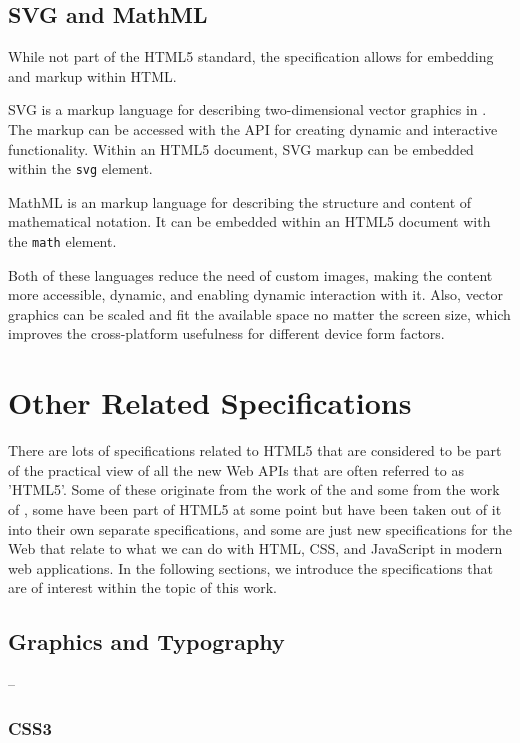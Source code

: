 \subsection{SVG and MathML}

While not part of the HTML5 standard, the specification allows for
embedding  \cite{SVGTiny12} and  \cite{MathML}
markup within HTML.

SVG is a markup language for describing two-dimensional vector
graphics in . The markup can be accessed with the 
API for creating dynamic and interactive functionality. Within an
HTML5 document, SVG markup can be embedded within the \texttt{svg}
element.

MathML is an  markup language for describing the structure
and content of mathematical notation. It can be embedded within an
HTML5 document with the \texttt{math} element.

Both of these languages reduce the need of custom images, making the
content more accessible, dynamic, and enabling dynamic interaction
with it. Also, vector graphics can be scaled and fit the available
space no matter the screen size, which improves the cross-platform
usefulness for different device form factors.

\section{Other Related Specifications}

There are lots of specifications related to HTML5 that are considered
to be part of the practical view of all the new Web APIs that are
often referred to as 'HTML5'. Some of these originate from the work of
the  and some from the work of , some have been
part of HTML5 at some point but have been taken out of it into their
own separate specifications, and some are just new specifications for
the Web that relate to what we can do with HTML, CSS, and JavaScript
in modern web applications. In the following sections, we introduce
the specifications that are of interest within the topic of this work.

\subsection{Graphics and Typography}

--

\subsubsection{CSS3}

